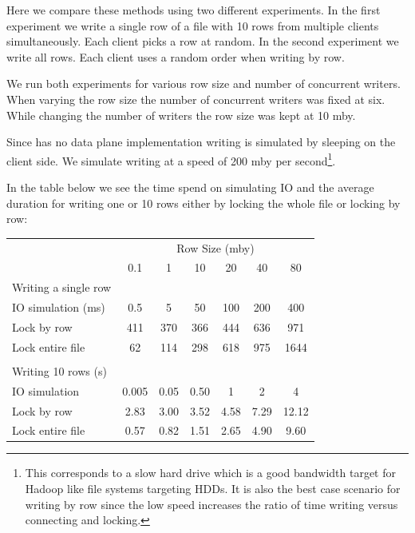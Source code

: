 Here we compare these methods using two different experiments. In the first experiment we write a single row of a file with 10 rows from multiple clients simultaneously. Each client picks a row at random. In the second experiment we write all rows. Each client uses a random order when writing by row.

We run both experiments for various row size and number of concurrent writers. When varying the row size the number of concurrent writers was fixed at six. While changing the number of writers the row size was kept at 10 \ac{mby}.

Since \name{} has no data plane implementation writing is simulated by sleeping on the client side. We simulate writing at a speed of 200 \ac{mby} per second\footnote{This corresponds to a slow hard drive which is a good bandwidth target for Hadoop like file systems targeting HDDs. It is also the best case scenario for writing by row since the low speed increases the ratio of time writing versus connecting and locking.}.

In the table below we see the time spend on simulating IO and the average duration for writing one or 10 rows either by locking the whole file or locking by row:

\begin{tabular}{lcccccc} \toprule
	& \multicolumn{6}{c}{Row Size (\ac{mby})} \\ \cmidrule(r){2-7}
	                   & 0.1 & 1 & 10 & 20 & 40 & 80 \\ \midrule
	Writing a single row  \\ \cmidrule(r){1-1}
	IO simulation (ms) & 0.5          & 5          & 50          & 100         & 200         & 400 \\
	Lock by row & 411 & 370 & 366 & 444 & 636 & 971\\
	Lock entire file & 62 & 114 & 298 & 618 & 975 & 1644 \\
\smallskip \\
	Writing 10 rows (s)\\ \cmidrule(r){1-1}
	IO simulation & 0.005          & 0.05          & 0.50          & 1         & 2         & 4 \\
	Lock by row & 2.83         & 3.00       & 3.52        & 4.58        & 7.29        & 12.12 \\
	Lock entire file & 0.57         & 0.82       & 1.51        & 2.65        & 4.90        & 9.60 \\ \bottomrule
\end{tabular}


